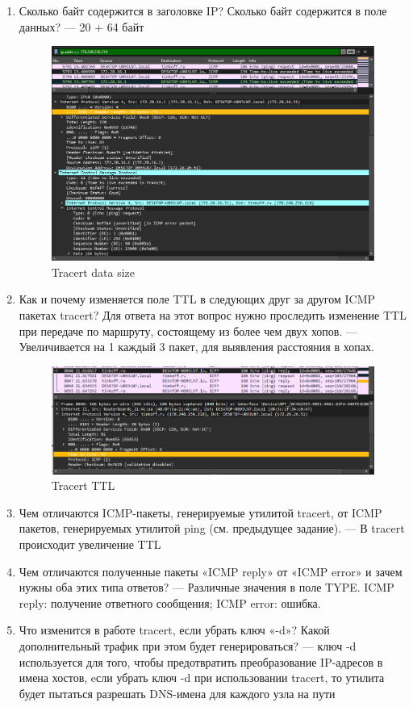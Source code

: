 \begin{enumerate}
    \item Сколько байт содержится в заголовке IP? Сколько байт содержится в 
    поле данных? --- 20 + 64 байт
    \begin{figure}[H]
        \centering
        \includegraphics[width=1\linewidth]{res/tracert-data-size.png}
        \caption{Tracert data size}
        \label{fig:tracert-datasize}
    \end{figure}
    \item Как и почему изменяется поле TTL в следующих друг за другом ICMP пакетах tracert? Для ответа на этот вопрос нужно проследить изменение TTL при передаче по маршруту, состоящему из более чем двух хопов. --- Увеличивается на 1 каждый 3 пакет, для выявления расстояния в хопах.
    \begin{figure}[H]
        \centering
        \includegraphics[width=1\linewidth]{res/tracert-ttl.png}
        \caption{Tracert TTL}
        \label{fig:tracert-ttl}
    \end{figure}
    \item Чем отличаются ICMP-пакеты, генерируемые утилитой tracert, от ICMP пакетов, генерируемых утилитой ping (см. предыдущее задание). --- В tracert происходит увеличение TTL
    \item Чем отличаются полученные пакеты «ICMP reply» от «ICMP error» и зачем нужны оба этих типа ответов? --- Различные значения в поле TYPE. ICMP reply: получение ответного сообщения; ICMP error: ошибка. 
    \item Что изменится в работе tracert, если убрать ключ «-d»? Какой 
    дополнительный трафик при этом будет генерироваться? --- ключ -d используется для того, чтобы предотвратить преобразование IP-адресов в имена хостов, eсли убрать ключ -d при использовании tracert, то утилита будет пытаться разрешать DNS-имена для каждого узла на пути
\end{enumerate}

